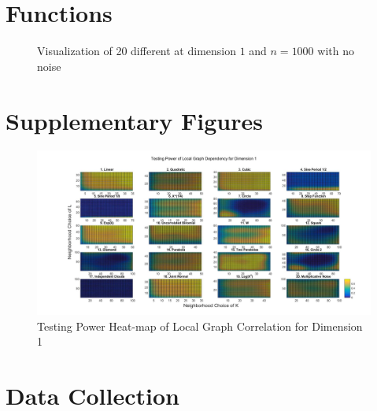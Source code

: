 \documentclass[11pt]{article}
\begin{document}
\appendix
\setcounter{figure}{0}
\renewcommand\thefigure{\arabic{figure}} 

\section{Functions}

\begin{figure}[htbp]
\caption{Visualization of 20 different at dimension $1$ and $n=1000$ with no noise}
\label{fig0}
\end{figure}


\section{Supplementary Figures}
\begin{figure}[htbp]
\includegraphics[width=1.0\textwidth]{../Figures/Fig2s}
\caption{Testing Power Heat-map of Local Graph Correlation for Dimension 1}
\label{figSim2}
\end{figure}


\section{Data Collection}
\end{document}

